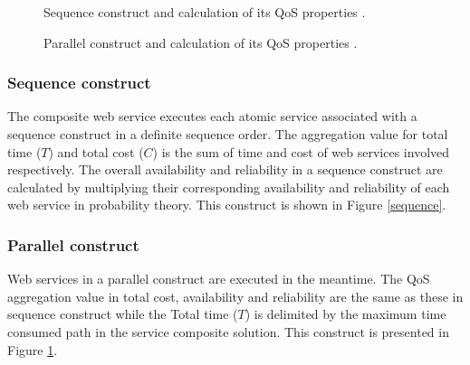 \documentclass{llncs}
\begin{document}
\begin{figure}[h]
\centerline{
}
\caption{Sequence construct and calculation of its QoS properties
\cite{yu2013adaptive}.}
\label{sequence}
\vspace{0.3cm}
\centerline{
}
\caption{Parallel construct and calculation of its QoS properties
\cite{yu2013adaptive}.}
\label{parallel}
\end{figure}

\subsubsection{Sequence construct}
The composite web service executes each atomic service associated with a sequence construct in a definite sequence order. The aggregation value for total time ($T$) and total cost ($C$) is the sum of time and cost of web services involved respectively. The overall availability and reliability in a sequence construct are calculated by multiplying their corresponding availability and reliability of each web service in probability theory. This construct is shown in Figure \ref{sequence}.
\subsubsection{Parallel construct}
Web services in a parallel construct are executed in the meantime. The QoS aggregation value in total cost, availability and reliability are the same as these in sequence construct while the Total time ($T$) is delimited by the maximum time consumed path in the service composite solution. This construct is presented in Figure \ref{parallel}.
\end{document}
